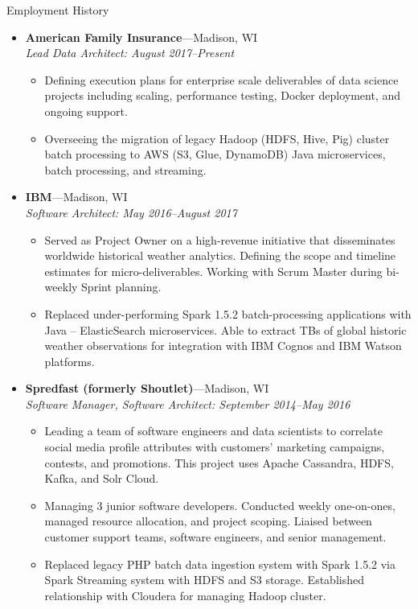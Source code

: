 \documentclass[11pt,oneside]{article}
\newenvironment{ressectionx}[1]{
	\vspace{4pt}
	{\fontfamily{phv}\selectfont\Large#1}
	\begin{itemize}[label={}]
	\vspace{3pt}
}{
	\end{itemize}
}
\newcommand{\ressubitem}[1]{
	\vspace{-1pt}
	\item \begin{flushleft} #1 \end{flushleft}
}
\newcommand{\resbigitem}[3]{
	\vspace{-5pt}
	\item
	\textbf{#1}---#2 \\
	\textit{#3}
}
\newenvironment{ressubsec}[3]{
	\resbigitem{#1}{#2}{#3}
	\vspace{-2pt}
	\begin{itemize}
}{
	\end{itemize}
}
\begin{document}
\begin{ressectionx}{Employment History}

\begin{ressubsec}{American Family Insurance}{Madison, WI}{Lead Data Architect: August 2017--Present}
		\ressubitem{Defining execution plans for enterprise scale deliverables of data science projects including scaling, performance testing, Docker deployment, and ongoing support.}
	\ressubitem{Overseeing the migration of legacy Hadoop (HDFS, Hive, Pig) cluster batch processing to AWS (S3, Glue, DynamoDB) Java microservices, batch processing, and streaming.}
	\end{ressubsec}


\begin{ressubsec}{IBM}{Madison, WI}{Software Architect: May 2016--August 2017}
		\ressubitem{Served as Project Owner on a high-revenue initiative that disseminates worldwide historical weather analytics. Defining the scope and timeline estimates for micro-deliverables. Working with Scrum Master during bi-weekly Sprint planning.}
		\ressubitem{Replaced under-performing Spark 1.5.2 batch-processing applications with Java -- ElasticSearch microservices. Able to extract TBs of global historic weather observations for integration with IBM Cognos and IBM Watson platforms.}
	\end{ressubsec}

\begin{ressubsec}{Spredfast (formerly Shoutlet)}{Madison, WI}{Software Manager, Software Architect: September 2014--May 2016}
		\ressubitem{Leading a team of software engineers and data scientists to correlate social media profile attributes with customers' marketing campaigns, contests, and promotions. This project uses Apache Cassandra, HDFS, Kafka, and Solr Cloud.}
		\ressubitem{Managing 3 junior software developers. Conducted weekly one-on-ones, managed resource allocation, and project scoping. Liaised between customer support teams, software engineers, and senior management.}
	\ressubitem{Replaced legacy PHP batch data ingestion system with Spark 1.5.2 via Spark Streaming system with HDFS and S3 storage. Established relationship with Cloudera for managing Hadoop cluster.}


\end{ressubsec}
\end{ressectionx}
\end{document}
